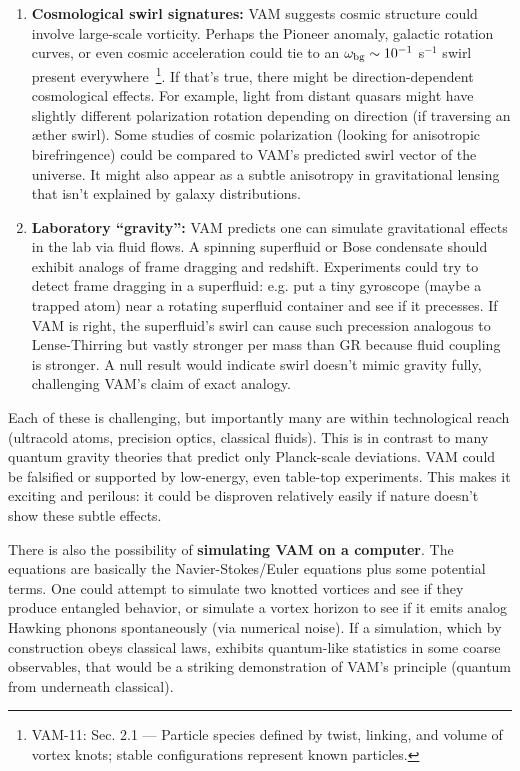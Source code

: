 \documentclass[a4paper,12pt]{article}
\begin{document}
\begin{enumerate}
        \item \textbf{Cosmological swirl signatures:}
        VAM suggests cosmic structure could involve large-scale vorticity. Perhaps the Pioneer anomaly, galactic rotation curves, or even cosmic acceleration could tie to an $\omega_{\rm bg} \sim 10^{-1}$ s$^{-1}$ swirl present everywhere~\footnote{VAM-11: Sec. 2.1 — Particle species defined by twist, linking, and volume of vortex knots; stable configurations represent known particles.}. If that’s true, there might be direction-dependent cosmological effects. For example, light from distant quasars might have slightly different polarization rotation depending on direction (if traversing an æther swirl). Some studies of cosmic polarization (looking for anisotropic birefringence) could be compared to VAM’s predicted swirl vector of the universe. It might also appear as a subtle anisotropy in gravitational lensing that isn’t explained by galaxy distributions.

        \item \textbf{Laboratory “gravity”:}
        VAM predicts one can simulate gravitational effects in the lab via fluid flows. A spinning superfluid or Bose condensate should exhibit analogs of frame dragging and redshift. Experiments could try to detect frame dragging in a superfluid: e.g. put a tiny gyroscope (maybe a trapped atom) near a rotating superfluid container and see if it precesses. If VAM is right, the superfluid’s swirl can cause such precession analogous to Lense-Thirring but vastly stronger per mass than GR because fluid coupling is stronger. A null result would indicate swirl doesn’t mimic gravity fully, challenging VAM’s claim of exact analogy.

    \end{enumerate}

    Each of these is challenging, but importantly many are within technological reach (ultracold atoms, precision optics, classical fluids). This is in contrast to many quantum gravity theories that predict only Planck-scale deviations. VAM could be falsified or supported by low-energy, even table-top experiments. This makes it exciting and perilous: it could be disproven relatively easily if nature doesn’t show these subtle effects.

    There is also the possibility of \textbf{simulating VAM on a computer}. The equations are basically the Navier-Stokes/Euler equations plus some potential terms. One could attempt to simulate two knotted vortices and see if they produce entangled behavior, or simulate a vortex horizon to see if it emits analog Hawking phonons spontaneously (via numerical noise). If a simulation, which by construction obeys classical laws, exhibits quantum-like statistics in some coarse observables, that would be a striking demonstration of VAM’s principle (quantum from underneath classical).
\end{document}
